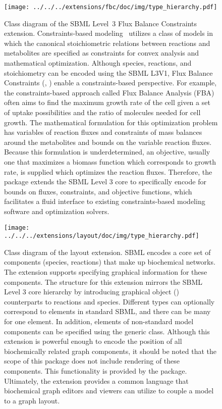 \begin{figure}[H]
 \vspace*{-3em}
 \centering
\texttt{[image: ../../../extensions/fbc/doc/img/type\_hierarchy.pdf]}
 \vspace*{-5.5em}
 \caption[Class diagram of the Flux Balance Constraints extension.]{Class
   diagram of the SBML Level~3 Flux Balance Constraints
   extension. Constraints-based modeling~\cite{lewis2012} utilizes a class
   of models in which the canonical stoichiometric relations between
   reactions and metabolites are specified as constraints for convex analysis
   and mathematical optimization. Although species, reactions, and
   stoichiometry can be encoded using the SBML L3V1, Flux Balance Constraints
   (, \cite{olivier2013}) enable a constraints-based
   perspective. For example, the constraints-based approach called Flux
   Balance Analysis (FBA) often aims to find the maximum growth rate of the
   cell given a set of uptake possibilities and the ratio of molecules needed
   for cell growth. The mathematical formulation for this optimization
   problem has variables of reaction fluxes and constraints of mass balances
   around the metabolites and bounds on the variable reaction fluxes. Because
   this formulation is underdetermined, an objective, usually one that
   maximizes a biomass function which corresponds to growth rate, is supplied
   which optimizes the reaction fluxes. Therefore, the  package
   extends the SBML Level 3 core to specifically encode for bounds on fluxes,
   constraints, and objective functions, which facilitates a fluid interface
   to existing constraints-based modeling software and optimization
   solvers.}
 \label{fig:fbc}
\end{figure}


\begin{figure}[H]
 \centering
\texttt{[image: ../../../extensions/layout/doc/img/type\_hierarchy.pdf]}
 \vspace*{-5em}
 \caption[Class diagram of the layout extension]{Class diagram of the layout extension. SBML encodes a core set of components (species, reactions) that make up
biochemical networks. The  extension supports specifying graphical
information for these components. The structure for this extension mirrors 
the SBML Level 3 core hierarchy by introducing graphical object ()
counterparts to reactions and species. Different  types can optionally correspond
to elements in standard SBML, and there can be many  for one element.
In addition,  elements of non-standard model components can be specified
using the generic  class. Although this extension is powerful
enough to encode the position of all biochemically related graph components,
it should be noted that the scope of this package does not include rendering
of these components. This functionality is provided by the  package.
Ultimately, the  extension provides a common language that biochemical
graph editors and viewers can utilize to couple a model to a graph layout.}
 \label{fig:layout}
\end{figure}


